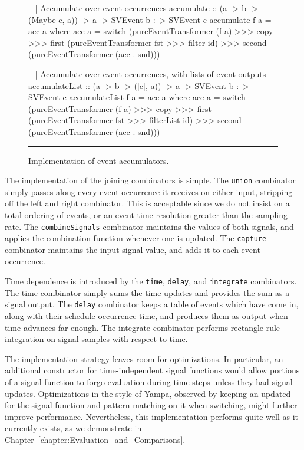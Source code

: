 \begin{figure}
\begin{code}
-- | Accumulate over event occurrences
accumulate :: (a -> b -> (Maybe c, a)) -> a -> SVEvent b :~> SVEvent c
accumulate f a = acc a
  where acc a = switch (pureEventTransformer (f a) >>>
                        copy >>>
                        first (pureEventTransformer fst >>> filter id) >>>
                        second (pureEventTransformer (acc . snd)))

-- | Accumulate over event occurrences, with lists of event outputs
accumulateList :: (a -> b -> ([c], a)) -> a -> SVEvent b :~> SVEvent c
accumulateList f a = acc a
  where acc a = switch (pureEventTransformer (f a) >>>
                        copy >>>
                        first (pureEventTransformer fst >>> filterList id) >>>
                        second (pureEventTransformer (acc . snd)))
\end{code}
\hrule
\caption{Implementation of event accumulators.}
\label{figure:accumulate_implementation}
\end{figure}

The implementation of the joining combinators is simple. The {\tt union}
combinator simply passes along every event occurrence it receives on either
input, stripping off the left and right combinator. This is acceptable since we
do not insist on a total ordering of events, or an event time resolution greater
than the sampling rate. The {\tt combineSignals} combinator maintains the values
of both signals, and applies the combination function whenever one is updated.
The {\tt capture} combinator maintains the input signal value, and adds it to
each event occurrence.

Time dependence is introduced by the {\tt time}, {\tt delay}, and {\tt integrate}
combinators. The time combinator simply sums the time updates and provides the
sum as a signal output. The {\tt delay} combinator keeps a table of events
which have come in, along with their schedule occurrence time, and produces
them as output when time advances far enough. The integrate combinator performs
rectangle-rule integration on signal samples with respect to time.

The implementation strategy leaves room for optimizations. In particular, an
additional constructor for time-independent signal functions would allow
portions of a signal function to forgo evaluation during time steps unless they
had signal updates. Optimizations in the style of Yampa, observed by keeping
an updated for the signal function and pattern-matching on it when switching,
might further improve performance. Nevertheless, this implementation performs
quite well as it currently exists, as we demonstrate in Chapter~\ref{chapter:Evaluation_and_Comparisons}.
